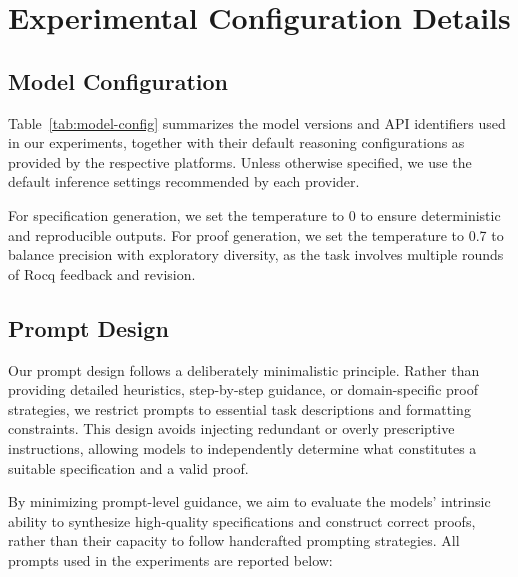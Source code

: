 \section{Experimental Configuration Details}
\label{appendix:config}

\subsection{Model Configuration}

Table~\ref{tab:model-config} summarizes the model versions and API identifiers used in our experiments,
together with their default reasoning configurations as provided by the respective platforms.
Unless otherwise specified, we use the default inference settings recommended by each provider. 

For specification generation, we set the temperature to 0 to ensure deterministic and reproducible outputs. For proof generation, we set the temperature to 0.7 to balance precision with exploratory diversity, as the task involves multiple rounds of Rocq feedback and revision.


\subsection{Prompt Design}

Our prompt design follows a deliberately minimalistic principle.
Rather than providing detailed heuristics, step-by-step guidance, or domain-specific proof strategies, we restrict prompts to essential task descriptions and formatting constraints.
This design avoids injecting redundant or overly prescriptive instructions, allowing models to independently determine what constitutes a suitable specification and a valid proof.

By minimizing prompt-level guidance, we aim to evaluate the models’ intrinsic ability to synthesize high-quality specifications and construct correct proofs, rather than their capacity to follow handcrafted prompting strategies.
All prompts used in the experiments are reported below:

\clearpage
\begin{table}[t]
\centering
\caption{Model configurations used in our experiments.}
\label{tab:model-config}
\end{table}


